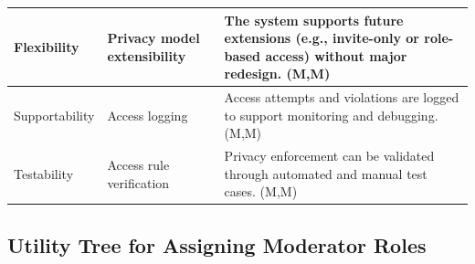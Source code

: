 \documentclass{article}
\begin{document}
\begin{table}[H]
\begin{tabular}{|p{3cm}|p{4cm}|p{7cm}|}
Flexibility
& Privacy model extensibility
& The system supports future extensions (e.g., invite-only or role-based access) without major redesign. (M,M) \\
\hline

Supportability
& Access logging
& Access attempts and violations are logged to support monitoring and debugging. (M,M) \\
\hline

Testability
& Access rule verification
& Privacy enforcement can be validated through automated and manual test cases. (M,M) \\
\hline

\end{tabular}
\end{table}

\subsection{Utility Tree for Assigning Moderator Roles}
\end{document}
